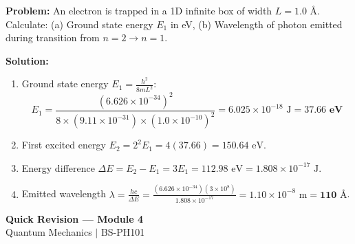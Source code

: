 \documentclass[12pt,a4paper]{article}
\begin{document}
\begin{tcolorbox}[examplebox, title={\textbf{Solved Problem 2: Particle in 1D Box Transition Energy}}]
\textbf{Problem:} An electron is trapped in a 1D infinite box of width $L = 1.0\text{ \AA}$. Calculate: (a) Ground state energy $E_1$ in eV, (b) Wavelength of photon emitted during transition from $n=2 \to n=1$.

\textbf{Solution:}\par\noindent
\begin{enumerate}[leftmargin=*, itemsep=2pt]
  \item Ground state energy $E_1 = \frac{h^2}{8 m L^2}$:
   \begin{equation}
   E_1 = \frac{(6.626 \times 10^{-34})^2}{8 \times (9.11 \times 10^{-31}) \times (1.0 \times 10^{-10})^2} = 6.025 \times 10^{-18}\text{ J} = \mathbf{37.66\text{ eV}}
   \end{equation}
  \item First excited energy $E_2 = 2^2 E_1 = 4 (37.66) = 150.64\text{ eV}$.
  \item Energy difference $\Delta E = E_2 - E_1 = 3 E_1 = 112.98\text{ eV} = 1.808 \times 10^{-17}\text{ J}$.
  \item Emitted wavelength $\lambda = \frac{h c}{\Delta E} = \frac{(6.626 \times 10^{-34}) (3 \times 10^8)}{1.808 \times 10^{-17}} = 1.10 \times 10^{-8}\text{ m} = \mathbf{110\text{ \AA}}$.
\end{enumerate}
\end{tcolorbox}

\newpage
\begin{center}
  {\large\bfseries\color{myred} Quick Revision --- Module 4}\\[3pt]
  {\small\color{mydark} Quantum Mechanics $|$ BS-PH101}
\end{center}
\noindent{\color{myred}\rule{\linewidth}{1.2pt}}
\vspace{4pt}
\end{document}
